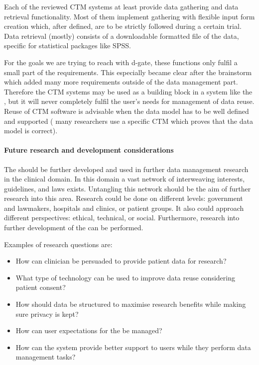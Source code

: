 Each of the reviewed CTM systems at least provide data gathering and data retrieval functionality.
Most of them implement gathering with flexible input form creation which, after defined, are to be strictly followed during a certain trial.
Data retrieval (mostly) consists of a downloadable formatted file of the data, specific for statistical packages like SPSS.

For the goals we are trying to reach with d-gate, these functions only fulfil a small part of the requirements. 
This especially became clear after the brainstorm which added many more requirements outside of the data management part.
Therefore the CTM systems may be used as a building block in a system like the \ivfsystem{}, but it will never completely fulfil the user's needs for  management of data reuse.
Reuse of CTM software is advisable when the data model has to be well defined and supported (\ie{} many researchers use a specific CTM which proves that the data model is correct).

\paragraph{Future research and development considerations}
The \ivfsystem{} should be further developed and used in further data management research in the clinical domain.
In this domain a vast network of interweaving interests, guidelines, and laws exists.
Untangling this network should be the aim of further research into this area.
Research could be done on different levels: government and lawmakers, hospitals and clinics, or patient groups.
It also could approach different perspectives: ethical, technical, or social.
Furthermore, research into further development of the \ivfsystem{} can be performed.

Examples of research questions are:

\begin{itemize}
	\item How can clinician be persuaded to provide patient data for research?
	\item What type of technology can be used to improve data reuse considering patient consent?
	\item How should data be structured to maximise research benefits while making sure privacy is kept?
	\item How can user expectations for the \ivfsystem{} be managed?
	\item How can the system provide better support to users while they perform data management tasks?
\end{itemize}